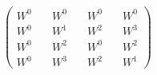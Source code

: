 $ \begin{pmatrix} W^0 \quad & W^0 \quad & W^0 \quad & W^0  \\[6pt] W^0 \quad & W^1 \quad & W^2 \quad & W^3 \\[6pt] W^0 \quad & W^2 \quad & W^0 \quad & W^2 \\[6pt] W^0 \quad & W^3 \quad & W^2 \quad & W^1 \end{pmatrix}$
